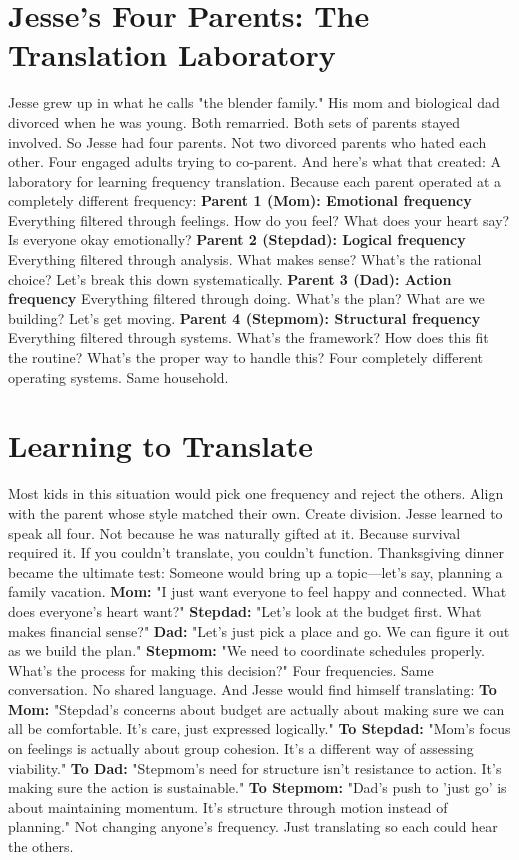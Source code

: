 \section{Jesse's Four Parents: The Translation Laboratory}

Jesse grew up in what he calls "the blender family."
His mom and biological dad divorced when he was young. Both remarried. Both sets of parents stayed involved.
So Jesse had four parents. Not two divorced parents who hated each other. Four engaged adults trying to co-parent.
And here's what that created: A laboratory for learning frequency translation.
Because each parent operated at a completely different frequency:
\textbf{Parent 1 (Mom): Emotional frequency}
Everything filtered through feelings. How do you feel? What does your heart say? Is everyone okay emotionally?
\textbf{Parent 2 (Stepdad): Logical frequency}
Everything filtered through analysis. What makes sense? What's the rational choice? Let's break this down systematically.
\textbf{Parent 3 (Dad): Action frequency}
Everything filtered through doing. What's the plan? What are we building? Let's get moving.
\textbf{Parent 4 (Stepmom): Structural frequency}
Everything filtered through systems. What's the framework? How does this fit the routine? What's the proper way to handle this?
Four completely different operating systems. Same household.

\section{Learning to Translate}

Most kids in this situation would pick one frequency and reject the others. Align with the parent whose style matched their own. Create division.
Jesse learned to speak all four.
Not because he was naturally gifted at it. Because survival required it. If you couldn't translate, you couldn't function.
Thanksgiving dinner became the ultimate test:
Someone would bring up a topic—let's say, planning a family vacation.
\textbf{Mom:} "I just want everyone to feel happy and connected. What does everyone's heart want?"
\textbf{Stepdad:} "Let's look at the budget first. What makes financial sense?"
\textbf{Dad:} "Let's just pick a place and go. We can figure it out as we build the plan."
\textbf{Stepmom:} "We need to coordinate schedules properly. What's the process for making this decision?"
Four frequencies. Same conversation. No shared language.
And Jesse would find himself translating:
\textbf{To Mom:} "Stepdad's concerns about budget are actually about making sure we can all be comfortable. It's care, just expressed logically."
\textbf{To Stepdad:} "Mom's focus on feelings is actually about group cohesion. It's a different way of assessing viability."
\textbf{To Dad:} "Stepmom's need for structure isn't resistance to action. It's making sure the action is sustainable."
\textbf{To Stepmom:} "Dad's push to 'just go' is about maintaining momentum. It's structure through motion instead of planning."
Not changing anyone's frequency. Just translating so each could hear the others.

